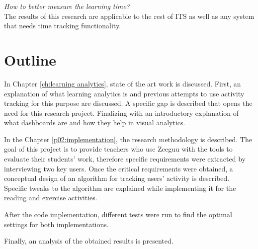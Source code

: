 \emph{How to better measure the learning time?}\\

The results of this research are applicable to the rest of ITS as well as any system that needs time tracking functionality.

\section{Outline}

In Chapter \ref{ch:learning analytics}, state of the art work is discussed. First, an explanation of what learning analytics is and previous attempts to use activity tracking for this purpose are discussed. A specific gap is described that opens the need for this research project. Finalizing with an introductory explanation of what dashboards are and how they help in visual analytics.

In the Chapter \ref{p02:implementation}, the research methodology is described. The goal of this project is to provide teachers who use Zeeguu with the tools to evaluate their students' work, therefore specific requirements were extracted by interviewing two key users. Once the critical requirements were obtained, a conceptual design of an algorithm for tracking users' activity is described. Specific tweaks to the algorithm are explained while implementing it for the reading and exercise activities.

After the code implementation, different tests were run to find the optimal settings for both implementations.

Finally, an analysis of the obtained results is presented.


